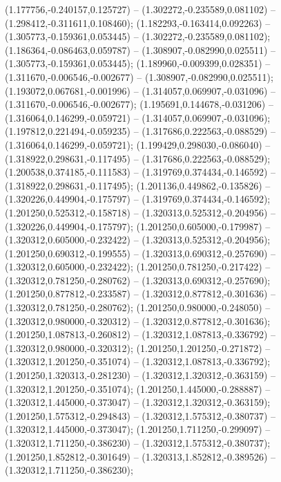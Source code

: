  (1.177756,-0.240157,0.125727) -- (1.302272,-0.235589,0.081102) -- (1.298412,-0.311611,0.108460);
 (1.182293,-0.163414,0.092263) -- (1.305773,-0.159361,0.053445) -- (1.302272,-0.235589,0.081102);
 (1.186364,-0.086463,0.059787) -- (1.308907,-0.082990,0.025511) -- (1.305773,-0.159361,0.053445);
 (1.189960,-0.009399,0.028351) -- (1.311670,-0.006546,-0.002677) -- (1.308907,-0.082990,0.025511);
 (1.193072,0.067681,-0.001996) -- (1.314057,0.069907,-0.031096) -- (1.311670,-0.006546,-0.002677);
 (1.195691,0.144678,-0.031206) -- (1.316064,0.146299,-0.059721) -- (1.314057,0.069907,-0.031096);
 (1.197812,0.221494,-0.059235) -- (1.317686,0.222563,-0.088529) -- (1.316064,0.146299,-0.059721);
 (1.199429,0.298030,-0.086040) -- (1.318922,0.298631,-0.117495) -- (1.317686,0.222563,-0.088529);
 (1.200538,0.374185,-0.111583) -- (1.319769,0.374434,-0.146592) -- (1.318922,0.298631,-0.117495);
 (1.201136,0.449862,-0.135826) -- (1.320226,0.449904,-0.175797) -- (1.319769,0.374434,-0.146592);
 (1.201250,0.525312,-0.158718) -- (1.320313,0.525312,-0.204956) -- (1.320226,0.449904,-0.175797);
 (1.201250,0.605000,-0.179987) -- (1.320312,0.605000,-0.232422) -- (1.320313,0.525312,-0.204956);
 (1.201250,0.690312,-0.199555) -- (1.320313,0.690312,-0.257690) -- (1.320312,0.605000,-0.232422);
 (1.201250,0.781250,-0.217422) -- (1.320312,0.781250,-0.280762) -- (1.320313,0.690312,-0.257690);
 (1.201250,0.877812,-0.233587) -- (1.320312,0.877812,-0.301636) -- (1.320312,0.781250,-0.280762);
 (1.201250,0.980000,-0.248050) -- (1.320312,0.980000,-0.320312) -- (1.320312,0.877812,-0.301636);
 (1.201250,1.087813,-0.260812) -- (1.320312,1.087813,-0.336792) -- (1.320312,0.980000,-0.320312);
 (1.201250,1.201250,-0.271872) -- (1.320312,1.201250,-0.351074) -- (1.320312,1.087813,-0.336792);
 (1.201250,1.320313,-0.281230) -- (1.320312,1.320312,-0.363159) -- (1.320312,1.201250,-0.351074);
 (1.201250,1.445000,-0.288887) -- (1.320312,1.445000,-0.373047) -- (1.320312,1.320312,-0.363159);
 (1.201250,1.575312,-0.294843) -- (1.320312,1.575312,-0.380737) -- (1.320312,1.445000,-0.373047);
 (1.201250,1.711250,-0.299097) -- (1.320312,1.711250,-0.386230) -- (1.320312,1.575312,-0.380737);
 (1.201250,1.852812,-0.301649) -- (1.320313,1.852812,-0.389526) -- (1.320312,1.711250,-0.386230);
